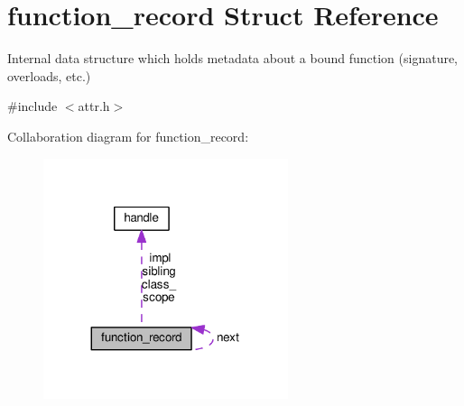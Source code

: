 \hypertarget{structfunction__record}{}\section{function\+\_\+record Struct Reference}
\label{structfunction__record}


Internal data structure which holds metadata about a bound function (signature, overloads, etc.)  




{\ttfamily \#include $<$attr.\+h$>$}



Collaboration diagram for function\+\_\+record\+:
\nopagebreak
\begin{figure}[H]
\begin{center}
\leavevmode
\includegraphics[width=203pt]{structfunction__record__coll__graph}
\end{center}
\end{figure}
